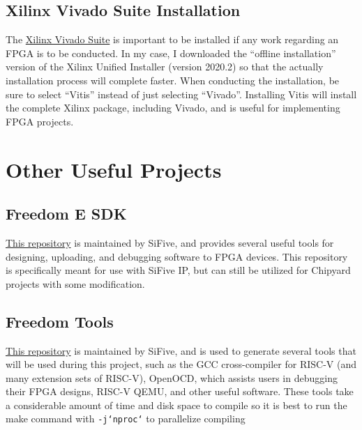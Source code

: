 \subsection{Xilinx Vivado Suite Installation}
The \hyperref{https://www.xilinx.com/support/download.html}{}{}{Xilinx Vivado Suite} is important to be installed if any work regarding an FPGA is to be conducted.
In my case, I downloaded the ``offline installation'' version of the Xilinx Unified Installer (version 2020.2) so that the actually installation process will complete faster.
When conducting the installation, be sure to select ``Vitis'' instead of just selecting ``Vivado''.
Installing Vitis will install the complete Xilinx package, including Vivado, and is useful for implementing FPGA projects.

\section{Other Useful Projects}
\subsection{Freedom E SDK}
\hyperref{https://github.com/sifive/freedom-e-sdk}{}{}{This repository} is maintained by SiFive, and provides several useful tools for designing, uploading, and debugging software to FPGA devices.
This repository is specifically meant for use with SiFive IP, but can still be utilized for Chipyard projects with some modification.

\subsection{Freedom Tools}
\hyperref{https://github.com/sifive/freedom-tools}{}{}{This repository} is maintained by SiFive, and is used to generate several tools that will be used during this project, such as the GCC cross-compiler for RISC-V (and many extension sets of RISC-V), OpenOCD, which assists users in debugging their FPGA designs, RISC-V QEMU, and other useful software.
These tools take a considerable amount of time and disk space to compile so it is best to run the make command with \texttt{-j`nproc`} to parallelize compiling


